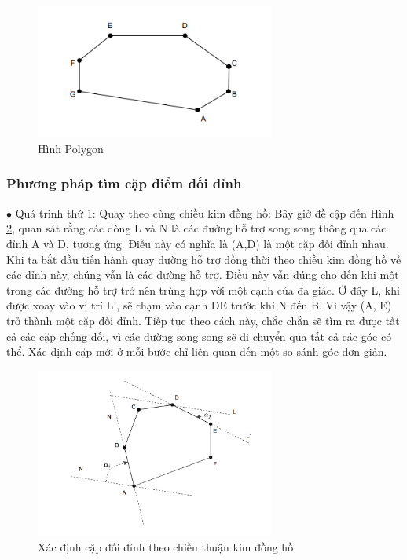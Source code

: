     \begin{figure}[H]
        \centering
        \includegraphics[width=0.7\textwidth]{chapter4/image/anh1.png}
        \caption{Hình Polygon}
        \label{fig:anh1}
    \end{figure}

\subsubsection{Phương pháp tìm cặp điểm đối đỉnh}
$\bullet$ Quá trình thứ 1: Quay theo cùng chiều kim đồng hồ:
Bây giờ đề cập đến Hình \ref{fig:anh2}, quan sát rằng các dòng L và N là các đường hỗ trợ song song thông qua các đỉnh A và D, tương ứng. Điều này có nghĩa là (A,D) là một cặp đối đỉnh nhau. Khi ta bắt đầu tiến hành quay đường hỗ trợ đồng thời theo chiều kim đồng hồ về các đỉnh này, chúng vẫn là các đường hỗ trợ. Điều này vẫn đúng cho đến khi một trong các đường hỗ trợ trở nên trùng hợp với một cạnh của đa giác. Ở đây L, khi được xoay vào vị trí L', sẽ chạm vào cạnh DE trước khi N đến B. Vì vậy (A, E) trở thành một cặp đối đỉnh. Tiếp tục theo cách này, chắc chắn sẽ tìm ra được tất cả các cặp chống đối, vì các đường song song sẽ di chuyển qua tất cả các góc có thể. Xác định cặp mới ở mỗi bước chỉ liên quan đến một so sánh góc đơn giản.
    \begin{figure}[H]
        \centering
        \includegraphics[width=0.7\textwidth]{chapter4/image/anh2.png}
        \caption{Xác định cặp đối đỉnh theo chiều thuận kim đồng hồ}
        \label{fig:anh2}
    \end{figure}

